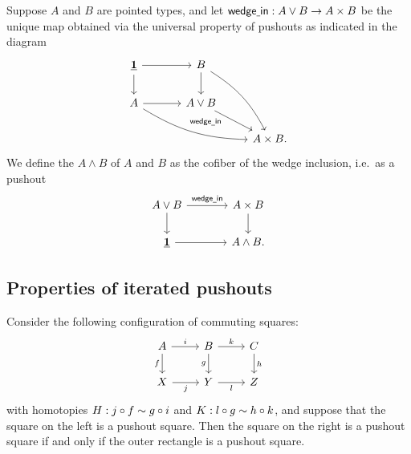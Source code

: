 \begin{defn}
Suppose $A$ and $B$ are pointed types, and let $\mathsf{wedge\underline{\ }{}in}:A\vee B\to A\times B$ be the unique map obtained via the universal property of pushouts as indicated in the diagram
\begin{equation*}
\begin{tikzcd}
\unit \arrow[d] \arrow[r] &[1em] B \arrow[d] \arrow[ddr,bend left=15] \\
A \arrow[r] \arrow[drr,bend right=15] & A\vee B \arrow[dr,swap,"\mathsf{wedge\usc{}in}" near start] \\
& & A \times B.
\end{tikzcd}
\end{equation*}
We define the  $A\wedge B$ of $A$ and $B$ as the cofiber of the wedge inclusion, i.e.~as a pushout
\begin{equation*}
\begin{tikzcd}[column sep=large]
A\vee B \arrow[r,"\mathsf{wedge\usc{}in}"] \arrow[d] & A\times B \arrow[d] \\
\unit \arrow[r] & A\wedge B.
\end{tikzcd}
\end{equation*}
\end{defn}

\subsection{Properties of iterated pushouts}
\begin{thm}\label{thm:pushout_pasting}
Consider the following configuration of commuting squares:
\begin{equation*}
\begin{tikzcd}
A \arrow[r,"i"] \arrow[d,swap,"f"] & B \arrow[r,"k"] \arrow[d,swap,"g"] & C \arrow[d,"h"] \\
X \arrow[r,swap,"j"] & Y \arrow[r,swap,"l"] & Z
\end{tikzcd}
\end{equation*}
with homotopies $H:j\circ f\sim g\circ i$ and $K:l\circ g\sim h\circ k$, and suppose that the square on the left is a pushout square. 
Then the square on the right is a pushout square if and only if the outer rectangle is a pushout square.
\end{thm}

